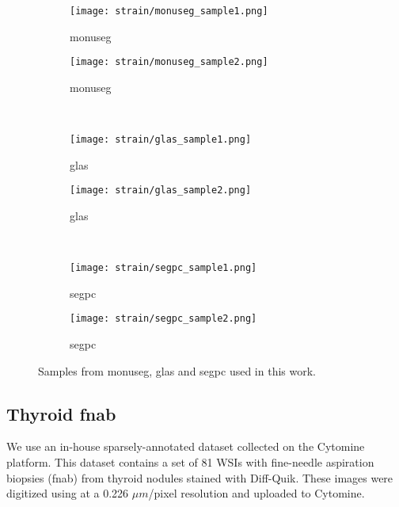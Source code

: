 \begin{figure}
  \centering
  \begin{subfigure}{0.48\textwidth}
    \centering
    \texttt{[image: strain/monuseg\_sample1.png]}
    \caption{\acrshort{monuseg}}
    \label{sfig:strain:monuseg_sample1}
  \end{subfigure}
  \begin{subfigure}{0.48\textwidth}
    \centering
    \texttt{[image: strain/monuseg\_sample2.png]}
    \caption{\acrshort{monuseg}}
    \label{sfig:strain:monuseg_sample2}
  \end{subfigure} \\

  \begin{subfigure}{0.48\textwidth}
    \centering
    \texttt{[image: strain/glas\_sample1.png]}
    \caption{\acrshort{glas}}
    \label{sfig:strain:glas_sample1}
  \end{subfigure}
  \begin{subfigure}{0.48\textwidth}
    \centering
    \texttt{[image: strain/glas\_sample2.png]}
    \caption{\acrshort{glas}}
    \label{sfig:strain:glas_sample2}
  \end{subfigure} \\

  \begin{subfigure}{0.48\textwidth}
    \centering
    \texttt{[image: strain/segpc\_sample1.png]}
    \caption{\acrshort{segpc}}
    \label{sfig:strain:segpc_sample1}
  \end{subfigure}
  \begin{subfigure}{0.48\textwidth}
    \centering
    \texttt{[image: strain/segpc\_sample2.png]}
    \caption{\acrshort{segpc}}
    \label{sfig:strain:segpc_sample2}
  \end{subfigure} 
  
  \caption{Samples from \acrshort{monuseg}, \acrshort{glas} and \acrshort{segpc} used in this work.}
  \label{fig:strain:datasets_samples}
\end{figure}


\subsection{Thyroid \acrshort{fnab}}
\label{ssec:strain:thyroidfnab}

We use an in-house sparsely-annotated dataset collected on the Cytomine platform. This dataset contains a set of 81 WSIs with fine-needle aspiration biopsies (\acrshort{fnab}) from thyroid nodules stained with Diff-Quik. These images were digitized using  at a 0.226 $\mu m$/pixel resolution and uploaded to Cytomine. 


